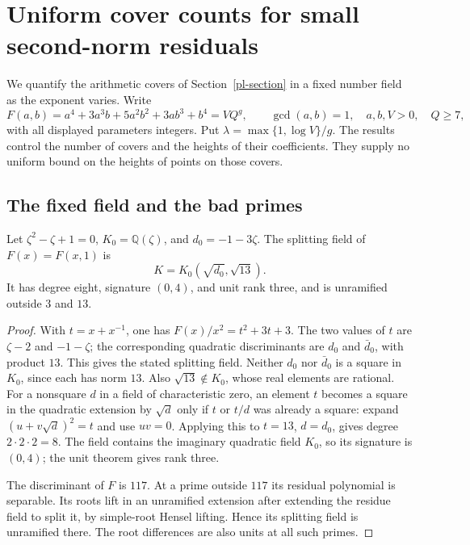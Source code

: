 \section{Uniform cover counts for small second-norm residuals}
\label{qc-section}

We quantify the arithmetic covers of Section~\ref{pl-section} in a
fixed number field as the exponent varies. Write
\[
 F(a,b)=a^4+3a^3b+5a^2b^2+3ab^3+b^4=VQ^g,
 \qquad \gcd(a,b)=1,\quad a,b,V>0,\quad Q\ge7,
\]
with all displayed parameters integers. Put
$\lambda=\max\{1,\log V\}/g$. The results control the number of covers
and the heights of their coefficients. They supply no uniform bound
on the heights of points on those covers.

\subsection{The fixed field and the bad primes}

\begin{lemma}\label{qc-fixed-field}
Let $\zeta^2-\zeta+1=0$, $K_0=\mathbb Q(\zeta)$, and
$d_0=-1-3\zeta$. The splitting field of $F(x)=F(x,1)$ is
\[
 K=K_0(\sqrt{d_0},\sqrt{13}).
\]
It has degree eight, signature $(0,4)$, and unit rank three, and is
unramified outside $3$ and $13$.
\end{lemma}
\begin{proof}
With $t=x+x^{-1}$, one has $F(x)/x^2=t^2+3t+3$. The two values of
$t$ are $\zeta-2$ and $-1-\zeta$; the corresponding quadratic
discriminants are $d_0$ and $\bar d_0$, with product $13$. This gives
the stated splitting field. Neither $d_0$ nor $\bar d_0$ is a square
in $K_0$, since each has norm $13$. Also $\sqrt{13}\notin K_0$,
whose real elements are rational. For a nonsquare $d$ in a field of
characteristic zero, an element $t$ becomes a square in the quadratic
extension by $\sqrt d$ only if $t$ or $t/d$ was already a square:
expand $(u+v\sqrt d)^2=t$ and use $uv=0$. Applying this to
$t=13$, $d=d_0$, gives degree $2\cdot2\cdot2=8$.
The field contains the imaginary quadratic field $K_0$, so its
signature is $(0,4)$; the unit theorem gives rank three.

The discriminant of $F$ is $117$. At a prime outside $117$ its
residual polynomial is separable. Its roots lift in an unramified
extension after extending the residue field to split it, by simple-root
Hensel lifting. Hence its splitting field is unramified there.
The root differences are also units at all such primes.
\end{proof}

